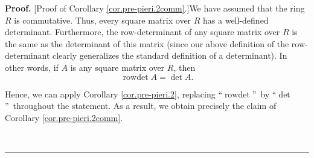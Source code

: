 \documentclass[numbers=enddot,12pt,final,onecolumn,notitlepage,english]{scrartcl}%
\theoremstyle{definition}
\newenvironment{proof}[1][Proof]{\noindent\textbf{#1.} }{\ \rule{0.5em}{0.5em}}
\newenvironment{vershort}{}{}
\begin{document}
\begin{proof}
[Proof of Corollary \ref{cor.pre-pieri.2comm}.]We have assumed that the ring
$R$ is commutative. Thus, every square matrix over $R$ has a well-defined
determinant. Furthermore, the row-determinant of any square matrix over $R$ is
the same as the determinant of this matrix (since our above definition of the
row-determinant clearly generalizes the standard definition of a determinant).
In other words, if $A$ is any square matrix over $R$, then%
\begin{equation}
\operatorname*{rowdet}A=\det A. \label{pf.cor.pre-pieri.2comm.rd=d}%
\end{equation}


\begin{vershort}
Hence, we can apply Corollary \ref{cor.pre-pieri.2}, replacing
\textquotedblleft$\operatorname*{rowdet}$\textquotedblright\ by
\textquotedblleft$\det$\textquotedblright\ throughout the statement. As a
result, we obtain precisely the claim of Corollary \ref{cor.pre-pieri.2comm}.
\qedhere

\end{vershort}


\end{proof}
\end{document}
